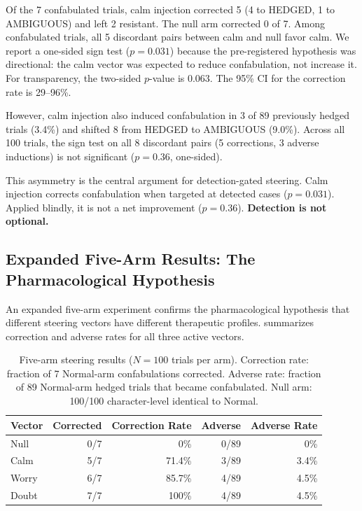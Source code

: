 Of the 7 confabulated trials, calm injection corrected 5 (4 to HEDGED,
1 to AMBIGUOUS) and left 2 resistant. The null arm corrected 0 of 7.
Among confabulated trials, all 5 discordant pairs between calm and null
favor calm. We report a one-sided sign test ($p = 0.031$) because the
pre-registered hypothesis was directional: the calm vector was expected
to reduce confabulation, not increase it. For transparency, the
two-sided $p$-value is 0.063. The 95\% CI for the correction
rate is 29--96\%.

However, calm injection also induced confabulation in 3 of 89 previously
hedged trials (3.4\%) and shifted 8 from HEDGED to AMBIGUOUS (9.0\%).
Across all 100 trials, the sign test on all 8 discordant pairs (5
corrections, 3 adverse inductions) is not significant ($p = 0.36$,
one-sided).

This asymmetry is the central argument for detection-gated steering.
Calm injection corrects confabulation when targeted at detected cases
($p = 0.031$). Applied blindly, it is not a net improvement ($p = 0.36$).
\textbf{Detection is not optional.}

\subsection{Expanded Five-Arm Results: The Pharmacological Hypothesis}

An expanded five-arm experiment confirms the pharmacological hypothesis
that different steering vectors have different therapeutic profiles.
 summarizes correction and adverse rates for all
three active vectors.

\begin{table}[H]
\centering
\caption{Five-arm steering results ($N = 100$ trials per arm). Correction
  rate: fraction of 7 Normal-arm confabulations corrected. Adverse rate:
  fraction of 89 Normal-arm hedged trials that became confabulated.
  Null arm: 100/100 character-level identical to Normal.}
\label{tab:five_arm}
\begin{tabular}{lrrrr}
\toprule
Vector & Corrected & Correction Rate & Adverse & Adverse Rate \\
\midrule
Null   & 0/7 & 0\%    & 0/89 & 0\% \\
Calm   & 5/7 & 71.4\% & 3/89 & 3.4\% \\
Worry  & 6/7 & 85.7\% & 4/89 & 4.5\% \\
Doubt  & 7/7 & 100\%  & 4/89 & 4.5\% \\
\bottomrule
\end{tabular}
\end{table}

